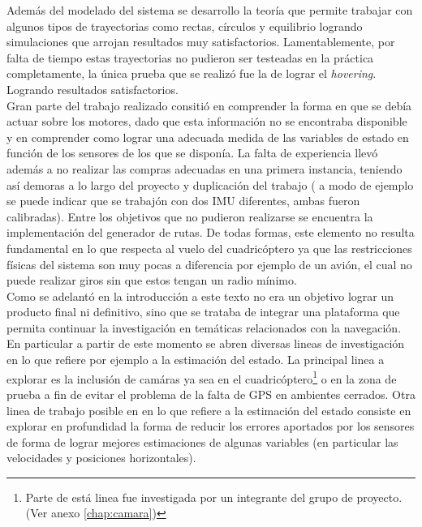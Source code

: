 \documentclass[main]{subfiles}
\begin{document}
Adem\'as del modelado del sistema se desarrollo la teor\'ia que permite trabajar con algunos tipos de trayectorias como rectas, c\'irculos y equilibrio logrando simulaciones que arrojan resultados muy satisfactorios. Lamentablemente, por falta de tiempo estas trayectorias no pudieron ser testeadas en la pr\'actica completamente, la \'unica prueba que se realiz\'o fue la de lograr el \emph{hovering}. Logrando resultados satisfactorios. \\

Gran parte del trabajo realizado consiti\'o en comprender la forma en que se deb\'ia actuar sobre los motores, dado que esta informaci\'on no se encontraba disponible y en comprender como lograr una adecuada medida de las variables de estado en funci\'on de los sensores de los que se dispon\'ia. La falta de experiencia llev\'o adem\'as a no realizar las compras adecuadas en una primera instancia, teniendo as\'i demoras a lo largo del proyecto y duplicaci\'on del trabajo ( a modo de ejemplo se puede indicar que se trabaj\'on con dos IMU diferentes, ambas fueron calibradas). Entre los objetivos que no pudieron realizarse se encuentra la implementaci\'on del generador de rutas. De todas formas, este elemento no resulta fundamental en lo que respecta al vuelo del cuadric\'optero ya que las restricciones f\'isicas del sistema son muy pocas a diferencia por ejemplo de un avi\'on, el cual no puede realizar giros sin que estos tengan un radio m\'inimo.\\

Como se adelant\'o en la introducci\'on a este texto no era un objetivo lograr un producto final ni definitivo, sino que se trataba de integrar una plataforma que permita continuar la investigaci\'on en tem\'aticas relacionados con la navegaci\'on. En particular a partir de este momento se abren diversas lineas de investigaci\'on en lo que refiere por ejemplo a la estimaci\'on del estado. La principal linea a explorar es la inclusi\'on de cam\'aras ya sea en el cuadric\'optero\footnote{Parte de est\'a linea fue investigada por un integrante del grupo de proyecto. (Ver anexo \ref{chap:camara})} o en la zona de prueba a fin de evitar el problema de la falta de GPS en ambientes cerrados. Otra linea de trabajo posible en en lo que refiere a la estimaci\'on del estado consiste en explorar en profundidad la forma de reducir los errores aportados por los sensores de forma de lograr mejores estimaciones de algunas variables (en particular las velocidades y posiciones horizontales).\\
\end{document}
